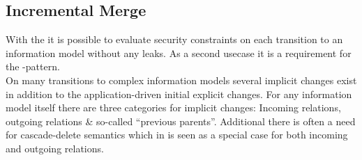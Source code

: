 \subsection{Incremental Merge}
With the  it is possible to evaluate security constraints on each transition to an information model without any leaks. As a second usecase it is a requirement for the -pattern.\\

On many transitions to complex information models several implicit changes exist in addition to the application-driven initial explicit changes. For any information model itself there are three categories for implicit changes: Incoming relations, outgoing relations \& so-called ``previous parents''. Additional there is often a need for cascade-delete semantics which in \AMBETH{} is seen as a special case for both incoming and outgoing relations.
